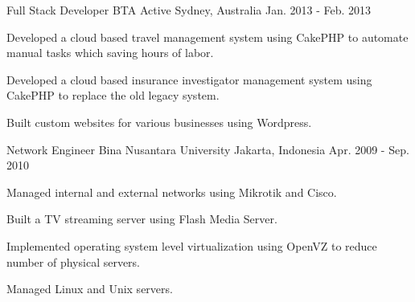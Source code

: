 \begin{cventries}
  \cventry
    {Full Stack Developer} %
    {BTA Active} %
    {Sydney, Australia} %
    {Jan. 2013 - Feb. 2013} %
    {
      \begin{cvitems} %
        \item {Developed a cloud based travel management system using CakePHP to automate manual tasks which saving hours of labor.}
        \item {Developed a cloud based insurance investigator management system using CakePHP to replace the old legacy system.}
        \item {Built custom websites for various businesses using Wordpress.}
      \end{cvitems}
    }

  \cventry
    {Network Engineer} %
    {Bina Nusantara University} %
    {Jakarta, Indonesia} %
    {Apr. 2009 - Sep. 2010} %
    {
      \begin{cvitems} %
        \item {Managed internal and external networks using Mikrotik and Cisco.}
        \item {Built a TV streaming server using Flash Media Server.}
        \item {Implemented operating system level virtualization using OpenVZ to reduce number of physical servers.}
        \item {Managed Linux and Unix servers.}
      \end{cvitems}
    }

\end{cventries}
